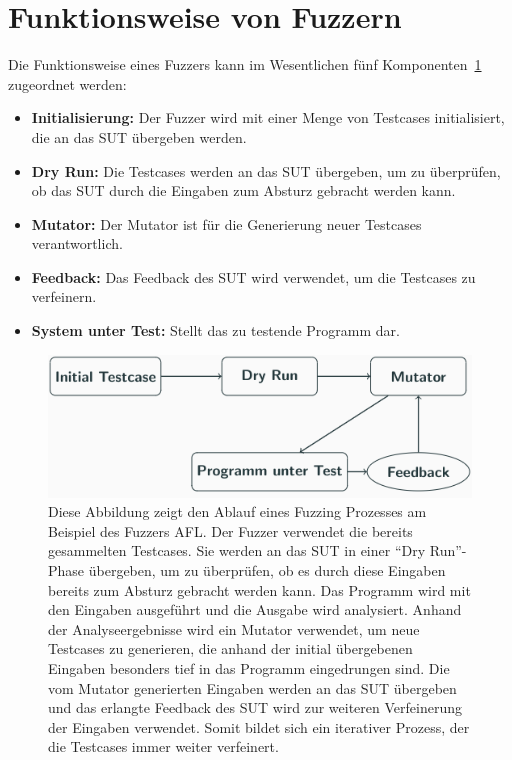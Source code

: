 \section{Funktionsweise von Fuzzern}\label{sec:funktionsweise}
Die Funktionsweise eines Fuzzers kann im Wesentlichen fünf Komponenten~\ref{fig:struktur_fuzzing} zugeordnet werden:
\begin{itemize}
    \item \textbf{Initialisierung:} Der Fuzzer wird mit einer Menge von Testcases initialisiert, die an das SUT übergeben werden.
    \item \textbf{Dry Run:} Die Testcases werden an das SUT übergeben, um zu überprüfen, ob das SUT durch die Eingaben zum
        Absturz gebracht werden kann.
    \item \textbf{Mutator:} Der Mutator ist für die Generierung neuer Testcases verantwortlich.
    \item \textbf{Feedback:} Das Feedback des SUT wird verwendet, um die Testcases zu verfeinern.
    \item \textbf{System unter Test:} Stellt das zu testende Programm dar.
\end{itemize}
\begin{figure}
    \centering
    \includegraphics[width=\columnwidth]{res/Struktur_eines_fuzzing_prozesses}
    \caption[Struktur eines Fuzzing Prozesses]{
        Diese Abbildung zeigt den Ablauf eines Fuzzing Prozesses am Beispiel des Fuzzers AFL.
        Der Fuzzer verwendet die bereits gesammelten Testcases.
        Sie werden an das SUT in einer \enquote{Dry Run}-Phase übergeben, um zu überprüfen, ob es durch diese Eingaben
        bereits zum Absturz gebracht werden kann.
        Das Programm wird mit den Eingaben ausgeführt und die Ausgabe wird analysiert.
        Anhand der Analyseergebnisse wird ein Mutator verwendet, um neue Testcases zu generieren, die anhand der initial
        übergebenen Eingaben besonders tief in das Programm eingedrungen sind.
        Die vom Mutator generierten Eingaben werden an das SUT übergeben und das erlangte Feedback des SUT wird zur weiteren
        Verfeinerung der Eingaben verwendet.
        Somit bildet sich ein iterativer Prozess, der die Testcases immer weiter verfeinert.
    }\label{fig:struktur_fuzzing}
\end{figure}
